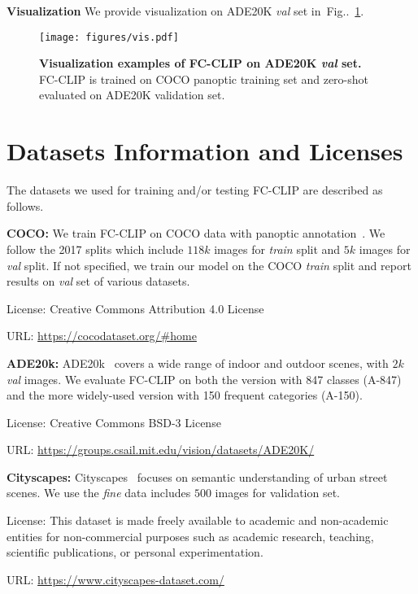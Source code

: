 \documentclass{article}
\makeatletter
\DeclareRobustCommand\onedot{\futurelet\@let@token\@onedot}
\def\@onedot{\ifx\@let@token.\else.\null\fi\xspace}
\newcommand{\figref}[1]{Fig\onedot~\ref{#1}}
\newcommand{\modelname}{FC-CLIP\xspace}
\makeatother
\begin{document}
\noindent \textbf{Visualization}\quad
We provide visualization on ADE20K \textit{val} set in~\figref{fig:ade20k_vis}.

\begin{figure}
    \centering
    \texttt{[image: figures/vis.pdf]}
    \vspace{-12ex}
    \caption{
    \textbf{Visualization examples of \modelname on ADE20K \textit{val} set.} \modelname is trained on COCO panoptic training set and zero-shot evaluated on ADE20K validation set.
    }
    \label{fig:ade20k_vis}
\end{figure}

\section{Datasets Information and Licenses}
The datasets we used for training and/or testing \modelname are described as follows.


\noindent\textbf{COCO:}\quad
We train \modelname on COCO data with panoptic annotation~\cite{lin2014microsoft}. We follow the 2017 splits which include $118k$ images for \textit{train} split and $5k$ images for \textit{val} split. If not specified, we train our model on the COCO \textit{train} split and report results on \textit{val} set of various datasets.

License: Creative Commons Attribution 4.0 License

URL: \url{https://cocodataset.org/#home}

\noindent\textbf{ADE20k:}\quad
ADE20k~\cite{zhou2017scene} covers a wide range of indoor and outdoor scenes, with $2k$ \textit{val} images. We evaluate \modelname on both the version with 847 classes (A-847) and the more widely-used version with 150 frequent categories (A-150).

License: Creative Commons BSD-3 License

URL: \url{https://groups.csail.mit.edu/vision/datasets/ADE20K/}

\noindent\textbf{Cityscapes:}\quad
Cityscapes~\cite{Cordts2016Cityscapes} focuses on semantic understanding of urban street scenes. We use the \textit{fine} data includes $500$ images for validation set.

License: This dataset is made freely available to academic and non-academic entities for non-commercial purposes such as academic research, teaching, scientific publications, or personal experimentation.

URL: \url{https://www.cityscapes-dataset.com/}
\end{document}
